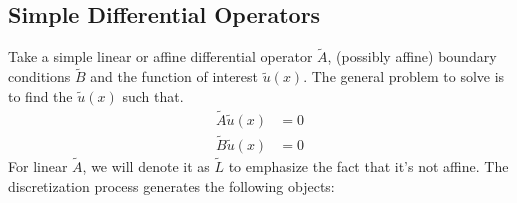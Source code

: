 \documentclass[11pt]{article}
\begin{document}
\subsection{Simple Differential Operators}\label{sec:general-simple}
Take a simple linear or affine differential operator $\tilde{A}$, (possibly affine) boundary conditions $\tilde{B}$ and the function of interest $\tilde{u}(x)$. The general problem to solve is to find the $\tilde{u}(x)$ such that.
\begin{align}
	\tilde{A} \tilde{u}(x) &= 0\label{eq:A-u-DE}\\
	\tilde{B} \tilde{u}(x) &= 0\label{eq:B-u-DE}
\end{align}
For linear $\tilde{A}$, we will denote it as $\tilde{L}$ to emphasize the fact that it's not affine. The discretization process generates the following objects:
\end{document}
